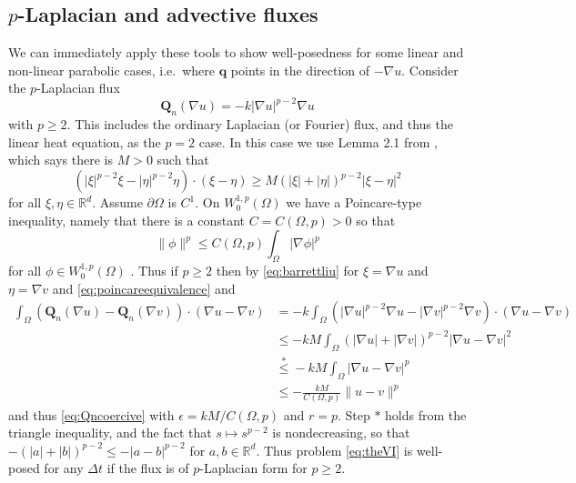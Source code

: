 \documentclass[final,leqno,onefignum,onetabnum]{siamltex1213bueler}
\newcommand\bq{\mathbf{q}}
\newcommand\bQ{\mathbf{Q}}
\newcommand\eps{\epsilon}
\renewcommand{\grad}{\nabla}
\newcommand\RR{\mathbb{R}}
\begin{document}
\subsection{$p$-Laplacian and advective fluxes} \label{subsec:plapadvect}  We can immediately apply these tools to show well-posedness for some linear and non-linear parabolic cases, i.e.~where $\bq$ points in the direction of $-\grad u$.  Consider the $p$-Laplacian \cite{Evans} flux
\begin{equation}
  \bQ_n(\grad u) = - k |\grad u|^{p-2} \grad u \label{eq:plapflux}
\end{equation}
with $p\ge 2$.  This includes the ordinary Laplacian (or Fourier) flux, and thus the linear heat equation, as the $p=2$ case.  In this case we use Lemma 2.1 from \cite{BarrettLiu1993}, which says there is $M>0$ such that
\begin{equation}
    (|\xi|^{p-2}\xi - |\eta|^{p-2}\eta)\cdot (\xi - \eta) \ge M \left(|\xi|+|\eta|\right)^{p-2} |\xi-\eta|^2  \label{eq:barrettliu}
\end{equation}
for all $\xi,\eta\in\RR^d$.  Assume $\partial \Omega$ is $C^1$.  On $W_0^{1,p}(\Omega)$ we have a Poincare-type inequality, namely that there is a constant $C = C(\Omega,p)>0$ so that
\begin{equation}
  \|\phi\|^p \le C(\Omega,p) \int_\Omega |\grad \phi|^p  \label{eq:poincareequivalence}
\end{equation}
for all $\phi\in W_0^{1,p}(\Omega)$ \cite[theorem 5.6.3]{Evans}.  Thus if $p\ge 2$ then by \eqref{eq:barrettliu} for $\xi = \grad u$ and $\eta = \grad v$ and \eqref{eq:poincareequivalence} and
\begin{align*}
\int_\Omega \left(\bQ_n(\grad u) - \bQ_n(\grad v)\right)\cdot (\grad u - \grad v) &= -k  \int_\Omega \left(|\grad u|^{p-2} \grad u - |\grad v|^{p-2} \grad v\right)\cdot (\grad u - \grad v) \\
  &\le - k M  \int_\Omega \left(|\grad u| + |\grad v|\right)^{p-2} |\grad u - \grad v|^2 \\
  &\stackrel{\ast}{\le} - k M  \int_\Omega |\grad u - \grad v|^p \\
  &\le - \frac{k M}{C(\Omega,p)} \|u-v\|^p
\end{align*}
and thus \eqref{eq:Qncoercive} with $\eps = kM/C(\Omega,p)$ and $r=p$.  Step $\ast$ holds from the triangle inequality, and the fact that $s\mapsto s^{p-2}$ is nondecreasing, so that $-(|a| + |b|)^{p-2} \le - |a-b|^{p-2}$ for $a,b\in\RR^d$.  Thus problem \eqref{eq:theVI} is well-posed for any $\Delta t$ if the flux is of $p$-Laplacian form for $p\ge 2$.
\end{document}
